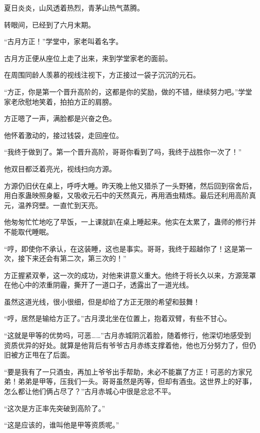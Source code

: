 
\begin{this_body}

夏日炎炎，山风透着热烈，青茅山热气蒸腾。

转眼间，已经到了六月末期。

“古月方正！”学堂中，家老叫着名字。

古月方正便从座位上走了出来，来到学堂家老的面前。

在周围同龄人羡慕的视线注视下，方正接过一袋子沉沉的元石。

“方正，你是第一个晋升高阶的，这都是你的奖励，做的不错，继续努力吧。”学堂家老欣慰地笑着，拍拍方正的肩膀。

方正嗯了一声，满脸都是兴奋之色。

他怀着激动的，接过钱袋，走回座位。

“我终于做到了。第一个晋升高阶，哥哥你看到了吗，我终于战胜你一次了！”

他双目都泛着亮光，视线扫向方源。

方源仍旧伏在桌上，呼呼大睡。昨天晚上他又猎杀了一头野猪，然后回到宿舍后，用白豕蛊映照身躯，又吸收元石中的天然真元，再用酒虫精炼。最后还利用高阶真元，温养窍壁。一直忙到天亮。

他匆匆忙忙地吃了早饭，一上课就趴在桌上睡起来。他实在太累了，蛊师的修行并不能取代睡眠。

“哼，即使你不承认，在这装睡，这也是事实。哥哥，我终于超越你了！这是第一次，接下来还会有第二次，第三次的！”

方正握紧双拳，这一次的成功，对他来讲意义重大。他终于将长久以来，方源笼罩在他心中的浓重阴霾，撕开了一道口子，透露出了一道光线。

虽然这道光线，很小很细，但是却给了方正无限的希望和鼓舞！

“哼，居然是输给方正了。”古月漠北坐在位置上，抱着双臂，有些不甘心。

“这就是甲等的优势吗，可恶……”古月赤城阴沉着脸，随着修行，他深切地感受到资质优异的好处。就算是他背后有爷爷古月赤练支撑着他，他也万分努力了，但仍旧被方正甩在了后面。

“要是我有了一只酒虫，再加上爷爷出手帮助，未必不能赢了方正！可恶的方家兄弟！弟弟是甲等，压我们一头。哥哥虽然是丙等，但却有酒虫。这世界上的好事，怎么都让他们俩占尽了？”古月赤城心中很是忿忿不平。

“这次是方正率先突破到高阶了。”

“这是应该的，谁叫他是甲等资质呢。”


\end{this_body}

